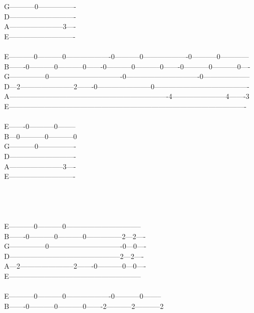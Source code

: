 {G-----------0----------------\\
D----------------------------\\
A-----------------------3----\\
E----------------------------\\
\\
E-----------0-----------0-------------------0-----------0-------------------0-----------0------------\\
B-------0-----------0-----------0-------0-----------0-----------0-------0-----------0-----------0----\\
G---------------0-------------------------------0-------------------------------0--------------------\\
D---2-----------------------2-------0-----------------------0----------------------------------------\\
A-------------------------------------------------------------------4-----------------------4-------3\\
E----------------------------------------------------------------------------------------------------\\
\\
E-------0-----------0--------\\
B---0-----------0-----------0\\
G-----------0----------------\\
D----------------------------\\
A-----------------------3----\\
E----------------------------\\
\\
\\
\\
\\
E-----------0-----------0--------------------------------\\
B-------0-----------0-----------0---------------2---2----\\
G---------------0-------------------------------0---0----\\
D-----------------------------------------------2---2----\\
A---2-----------------------2-------0-----------0---0----\\
E--------------------------------------------------------\\
\\
E-----------0-----------0-------------------0-----------0--------\\
B-------0-----------0-----------0-------2-----------2-----------2\\
}
